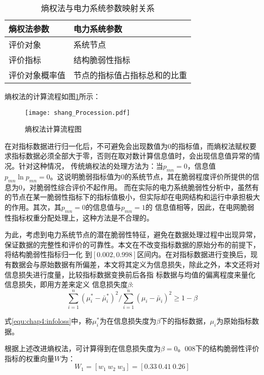 \begin{table}[htb]
  \centering
  \caption{熵权法与电力系统参数映射关系}
  \label{tab:lichaTable1}
    \begin{tabular}{C{5.5cm}C{5.5cm}}
      \toprule
      熵权法参数       & 电力系统参数 \\
      \midrule
      评价对象        &  系统节点 \\
      评价指标        &  结构脆弱性指标 \\
      评价对象概率值   & 节点的指标值占指标总和的比重 \\
      \bottomrule
    \end{tabular}
\end{table}

熵权法的计算流程如图\ref{fig:shang_Procession}所示：
\begin{figure}[H] %
  \centering
  \texttt{[image: shang\_Procession.pdf]}
  \caption{熵权法计算流程图}
  \label{fig:shang_Procession}
\end{figure}

在对指标数据进行归一化后，不可避免会出现数值为0的指标值，而熵权法赋权要求指标数据必须全部大于零，否则在取对数计算信息值时，会出现信息值异常的情况。针对这种情况，
传统熵权法的处理方法为：当$p_{mn}=0$，信息值$p_{m n} \ln p_{m n}=0$。这说明脆弱指标值为0的系统节点，其在脆弱程度评价所提供的信息为0，对脆弱性综合评价不起作用。
而在实际的电力系统脆弱性分析中，虽然有的节点在某一脆弱性指标下的指标值极小，但实际却在电网结构和运行中承担极大的作用。其次，其$p_{mn}=0$的信息值与$p_{mn}=1$的
信息值相等，因此，在电网脆弱性指标权重分配处理上，这种方法是不合理的。

为此，考虑到电力系统节点的潜在脆弱性特征，避免在数据处理过程中出现异常，保证数据的完整性和评价的可靠性。本文在不改变指标数据的原始分布的前提下，将结构脆弱性指标归一化
到$[0.002,0.998]$区间内。在对指标数据进行变换后，现有数据会与原始数据有所偏差，本文将其定义为信息损失，除此之外，本文还将对信息损失进行度量，比较指标数据变换前后各指
标数据与均值的偏离程度来量化信息损失，即用方差来定义
信息损失度$\beta$:
\begin{equation}
  \label{equ:chap4:infoloss}
\sum_{i=1}^{n}\left(\mu_{i}^{*}-\bar{\mu}_{i}^{*}\right)^{2} /\sum_{i=1}^{n}\left(\mu_{i}-\bar{\mu}_{i}\right)^{2} \geq 1-\beta 
\end{equation}

式\ref{equ:chap4:infoloss}中，称$\mu_{i}^{*}$为在信息损失度为$\beta$下的指标数据，$\mu_{i}$为原始指标数据。

根据上述改进熵权法，可计算得到在信息损失度为$\beta=0。008$下的结构脆弱性评价指标的权重向量$W$为：
\begin{equation}
\label{equ:chap4:shang2}
   W_1 = \left[w_{1}\ w_{2}\ w_{3}\right]=[0.33\ 0.41\ 0.26]
\end{equation}



